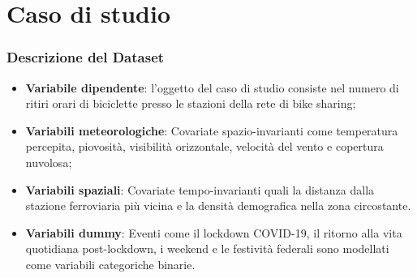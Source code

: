 \section{Caso di studio}
\begin{frame}
	\frametitle{Descrizione del Dataset}
	\centering
	
	\begin{itemize}
		\justifying
		\item \textbf{Variabile dipendente}: l'oggetto del caso di studio consiste nel numero di ritiri orari di biciclette presso le stazioni della rete di bike sharing;
		\item \textbf{Variabili meteorologiche}: Covariate spazio-invarianti come temperatura percepita, piovosità, visibilità orizzontale, velocità del vento e copertura nuvolosa;
		\item \textbf{Variabili spaziali}: Covariate tempo-invarianti quali la distanza dalla stazione ferroviaria più vicina e la densità demografica nella zona circostante.
		\item \textbf{Variabili dummy}: Eventi come il lockdown COVID-19, il ritorno alla vita quotidiana post-lockdown, i weekend e le festività federali sono modellati come variabili categoriche binarie.
	\end{itemize}	
\end{frame}

